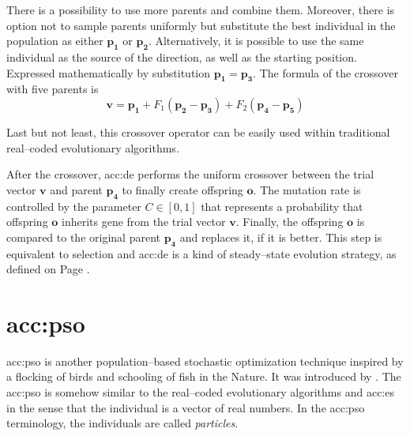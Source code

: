 There is a possibility to use more parents and combine them. Moreover, there is option not to sample parents uniformly but substitute the best individual in the population as either $\mathbf{p_1}$ or $\mathbf{p_2}$. Alternatively, it is possible to use the same individual as the source of the direction, as well as the starting position. Expressed mathematically by substitution $\mathbf{p_1} = \mathbf{p_3}$. The formula of the crossover with five parents is
$$
\mathbf{v} = \mathbf{p_1} + F_1\left( \mathbf{p_2} - \mathbf{p_3} \right) + F_2\left( \mathbf{p_4} - \mathbf{p_5} \right)
$$

Last but not least, this crossover operator can be easily used within traditional real--coded evolutionary algorithms.

After the crossover, \acrshort{acc:de} performs the uniform crossover between the trial vector $\mathbf{v}$ and parent $\mathbf{p_4}$ to finally create offspring $\mathbf{o}$. The mutation rate is controlled by the parameter $C\in\left[0,1\right]$ that represents a probability that offspring $\mathbf{o}$ inherits gene from the trial vector $\mathbf{v}$. Finally, the offspring $\mathbf{o}$ is compared to the original parent $\mathbf{p_4}$ and replaces it, if it is better. This step is equivalent to selection and \acrshort{acc:de} is a kind of steady--state evolution strategy, as defined on Page \pageref{enum:steadystate}.




\section{\texorpdfstring{\acrlong*{acc:pso}}{Particle Swarm Optimization}}

\acrfull{acc:pso} is another population--based stochastic optimization technique inspired by a flocking of birds and schooling of fish in the Nature. It was introduced by \citet*{PSOOriginal}. The \acrshort{acc:pso} is somehow similar to the real--coded evolutionary algorithms and \acrshort{acc:es} in the sense that the individual is a vector of real numbers. In the \acrshort{acc:pso} terminology, the individuals are called \emph{particles}.

